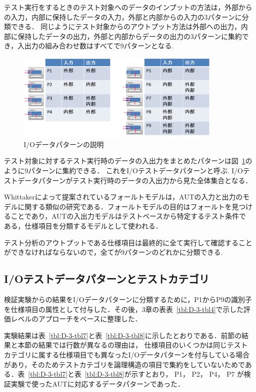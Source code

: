 テスト実行をするときのテスト対象へのデータのインプットの方法は，外部からの入力，内部に保持したデータの入力，外部と内部からの入力の3パターンに分類できる．
同じようにテスト対象からのアウトプット方法は外部への出力，内部に保持したデータの出力，外部と内部からデータの出力の3パターンに集約でき，入出力の組み合わせ数はすべてで9パターンとなる.
\begin{figure}[htbp]
\begin{center}
\includegraphics[width=10cm]{./image/D-3-Fig5.png}
\caption{I/Oデータパターンの説明}
\label{fig:D-4-Fig6}
\end{center}
\end{figure}

テスト対象に対するテスト実行時のデータの入出力をまとめたパターンは図~\ref{fig:D-4-Fig6}のように9パターンに集約できる．
これをI/Oテストデータパターンと呼ぶ.
I/Oテストデータパターンがテスト実行時のデータの入出力から見た全体集合となる．

Whittakerによって提案されているフォールトモデル\cite{whittaker2003break}は，AUTの入力と出力のモデルに関する類似の研究である．フォールトモデルの目的はフォールトを見つけることであり，AUTの入出力モデルはテストベースから特定するテスト条件である，仕様項目を分類するモデルとして使われる．

テスト分析のアウトプットである仕様項目は最終的に全て実行して確認することができなければならないので，全てが9パターンのどれかに分類できる.

\subsection{I/Oテストデータパターンとテストカテゴリ}

検証実験からの結果をI/Oデータパターンに分類するために，P1からP9の識別子を仕様項目の属性として付与した．その後，3章の表表~\ref{tbl:D-3-tbl4}で示した評価レベルのアプローチをベースに整理した．

実験結果は表~\ref{tbl:D-3-tbl7}と表~\ref{tbl:D-3-tbl8}に示したとおりである．前節の結果と本節の結果では行数が異なるの理由は， 仕様項目のいくつかは同じテストカテゴリに属する仕様項目でも異なったI/Oデータパターンを付与している場合があり，そのためテストカテゴリを論理構造の項目で集約をしていないためである．表~\ref{tbl:D-3-tbl7}と表~\ref{tbl:D-3-tbl8}が示すとおり， P1， P2， P4， P7 が検証実験で使ったAUTに対応するデータパターンであった．

